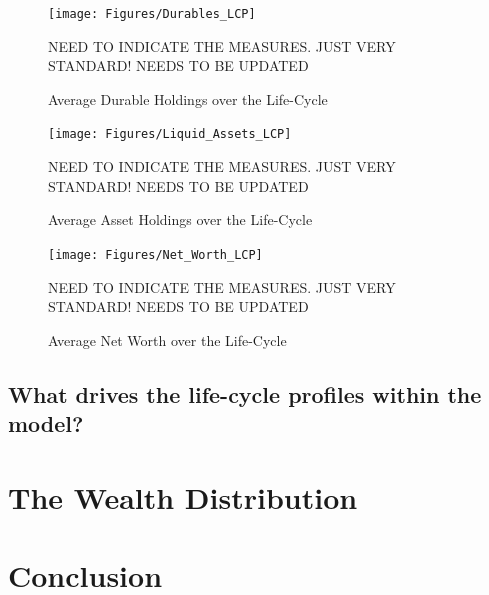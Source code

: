 \documentclass[a4paper,12pt]{article}
\begin{document}
\begin{figure}
\caption{Average Durable Holdings over the Life-Cycle} 
\label{cash_equivalent_ue_vs_e}	%
\centering
\texttt{[image: Figures/Durables\_LCP]}  %

\begin{minipage}{0.8\linewidth}
\footnotesize{NEED TO INDICATE THE MEASURES. JUST VERY STANDARD! NEEDS TO BE UPDATED}
\end{minipage}

\end{figure}

\begin{figure}
\caption{Average Asset Holdings over the Life-Cycle} 
\label{cash_equivalent_ue_vs_e}	%
\centering
\texttt{[image: Figures/Liquid\_Assets\_LCP]}  %

\begin{minipage}{0.8\linewidth}
\footnotesize{NEED TO INDICATE THE MEASURES. JUST VERY STANDARD! NEEDS TO BE UPDATED}
\end{minipage}

\end{figure}

\begin{figure}
\caption{Average Net Worth over the Life-Cycle} 
\label{cash_equivalent_ue_vs_e}	%
\centering
\texttt{[image: Figures/Net\_Worth\_LCP]}  %

\begin{minipage}{0.8\linewidth}
\footnotesize{NEED TO INDICATE THE MEASURES. JUST VERY STANDARD! NEEDS TO BE UPDATED}
\end{minipage}

\end{figure}

\subsection{What drives the life-cycle profiles within the model?}

\label{Chapter4}
\section{The Wealth Distribution}
\label{Chapter5}
\section{Conclusion}
\label{Chapter6}
\end{document}
